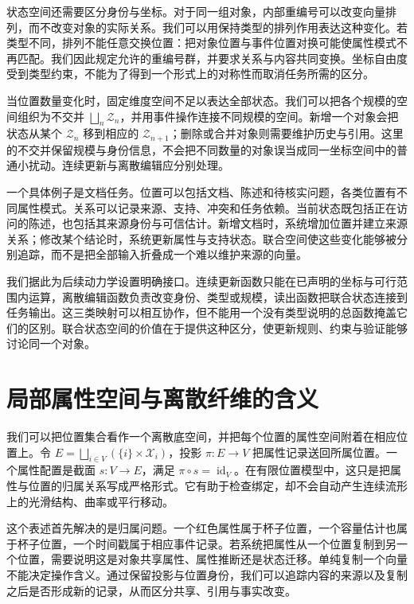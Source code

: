 状态空间还需要区分身份与坐标。对于同一组对象，内部重编号可以改变向量排列，而不改变对象的实际关系。我们可以用保持类型的排列作用表达这种变化。若类型不同，排列不能任意交换位置：把对象位置与事件位置对换可能使属性模式不再匹配。我们因此规定允许的重编号群，并要求关系与内容共同变换。坐标自由度受到类型约束，不能为了得到一个形式上的对称性而取消任务所需的区分。

当位置数量变化时，固定维度空间不足以表达全部状态。我们可以把各个规模的空间组织为不交并 $\bigsqcup_n\mathcal Z_n$，并用事件操作连接不同规模的空间。新增一个对象会把状态从某个 $\mathcal Z_n$ 移到相应的 $\mathcal Z_{n+1}$；删除或合并对象则需要维护历史与引用。这里的不交并保留规模与身份信息，不会把不同数量的对象误当成同一坐标空间中的普通小扰动。连续更新与离散编辑应分别处理。

一个具体例子是文档任务。位置可以包括文档、陈述和待核实问题，各类位置有不同属性模式。关系可以记录来源、支持、冲突和任务依赖。当前状态既包括正在访问的陈述，也包括其来源身份与可信估计。新增文档时，系统增加位置并建立来源关系；修改某个结论时，系统更新属性与支持状态。联合空间使这些变化能够被分别追踪，而不是把全部输入折叠成一个难以维护来源的向量。

我们据此为后续动力学设置明确接口。连续更新函数只能在已声明的坐标与可行范围内运算，离散编辑函数负责改变身份、类型或规模，读出函数把联合状态连接到任务输出。这三类映射可以相互协作，但不能用一个没有类型说明的总函数掩盖它们的区别。联合状态空间的价值在于提供这种区分，使更新规则、约束与验证能够讨论同一个对象。

\section{局部属性空间与离散纤维的含义}
\label{sec:object_section}

我们可以把位置集合看作一个离散底空间，并把每个位置的属性空间附着在相应位置上。令 $E=\bigsqcup_{i\in V}(\{i\}\times\mathcal X_i)$，投影 $\pi:E\to V$ 把属性记录送回所属位置。一个属性配置是截面 $s:V\to E$，满足 $\pi\circ s=\operatorname{id}_V$。在有限位置模型中，这只是把属性与位置的归属关系写成严格形式。它有助于检查绑定，却不会自动产生连续流形上的光滑结构、曲率或平行移动。

这个表述首先解决的是归属问题。一个红色属性属于杯子位置，一个容量估计也属于杯子位置，一个时间戳属于相应事件记录。若系统把属性从一个位置复制到另一个位置，需要说明这是对象共享属性、属性推断还是状态迁移。单纯复制一个向量不能决定操作含义。通过保留投影与位置身份，我们可以追踪内容的来源以及复制之后是否形成新的记录，从而区分共享、引用与事实改变。

